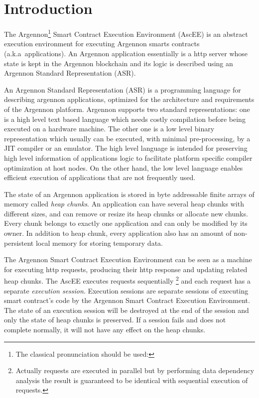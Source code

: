 

\section{Introduction}\label{sec:introduction}

The Argennon\footnote{The classical pronunciation should be used:} Smart Contract Execution
Environment (AscEE) is an abstract execution environment for executing Argennon smarts contracts (a.k.a\ applications).
An Argennon application essentially is a http server whose state is kept in the Argennon blockchain and
its logic is described using an Argennon Standard Representation (ASR).

An Argennon Standard Representation (ASR) is a programming language for describing argennon applications, optimized
for the architecture and requirements of the Argennon platform.
Argennon supports two standard representations: one is a high level text based language which needs
costly compilation before being executed on a hardware machine. The other one is a low level binary representation which
usually can be executed, with minimal pre-processing, by a JIT compiler or an emulator. The high level
language is intended for preserving high level information of applications logic to facilitate
platform specific compiler optimization at host nodes. On the other hand, the low level language enables efficient
execution of applications that are not frequently used.

The state of an Argennon application is stored in byte addressable finite arrays of memory called
\emph{heap chunks}. An application can have several heap chunks with different sizes, and can remove or
resize its heap chunks or allocate new chunks. Every chunk belongs to exactly one application and can only be modified
by its owner. In addition to heap chunk, every application also has an amount of non-persistent local memory for
storing temporary data.

The Argennon Smart Contract Execution Environment can be seen as a machine for executing http requests, producing
their http response and updating related heap
chunks. The AscEE executes requests sequentially \footnote{Actually requests are executed in parallel but by
performing data dependency analysis the result is guaranteed to be identical with sequential execution of
requests.} and each request has a separate \emph{execution session}. Execution sessions are separate sessions of
executing smart contract's code by the Argennon Smart Contract Execution Environment. The state of an execution
session will be
destroyed at the end of the session and only the state of heap chunks is preserved. If a session fails and does not
complete normally, it will not have any effect on the heap chunks.

